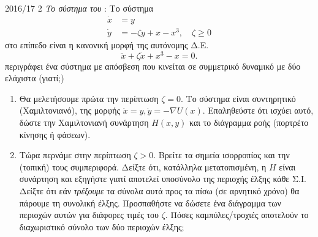 \begin{exercise}{2016/17 2}
    \emph{Το σύστημα του }: Το σύστημα
    \begin{align*}
        \dot{x} &= y \\
        \dot{y} &= -\zeta y + x - x^3, \quad \zeta \geq 0
    \end{align*}
    στο επίπεδο είναι η κανονική μορφή της αυτόνομης Δ.Ε.
    \begin{equation*}
        \ddot{x} + \zeta\dot{x} + x^3 - x = 0.
    \end{equation*}
    περιγράφει ένα σύστημα με απόσβεση που κινείται σε συμμετρικό δυναμικό με
    δύο ελάχιστα (γιατί;)
    \begin{enumerate}[label = (\alph*)]
        \item Θα μελετήσουμε πρώτα την περίπτωση \( \zeta = 0 \). Το σύστημα
            είναι συντηρητικό (Χαμιλτονιανό), της μορφής \( \dot{x} = y, \dot{y}
            = - \nabla U(x) \). Επαληθεύστε ότι ισχύει αυτό, δώστε την
            Χαμιλτονιανή συνάρτηση \( H(x, y) \) και το διάγραμμα ροής (πορτρέτο
            κίνησης ή φάσεων).
        \item Τώρα περνάμε στην περίπτωση \( \zeta > 0 \). Βρείτε τα σημεία
            ισορροπίας και την (τοπική) τους συμπεριφορά. Δείξτε ότι, κατάλληλα
            μετατοπισμένη, η \( H \) είναι συνάρτηση  και εξηγήστε
            γιατί αποτελεί υποσύνολο της περιοχής έλξης κάθε Σ.Ι. Δείξτε ότι εάν
            \emph{τρέξουμε} τα σύνολα αυτά προς τα πίσω (σε αρνητικό χρόνο) θα
            πάρουμε τη συνολική έλξης. Προσπαθήστε να δώσετε ένα διάγραμμα των
            περιοχών αυτών για διάφορες τιμές του \( \zeta \). Πόσες
            καμπύλες/τροχιές αποτελούν το διαχωριστικό σύνολο των δύο περιοχών
            έλξης;
    \end{enumerate}
\end{exercise}
